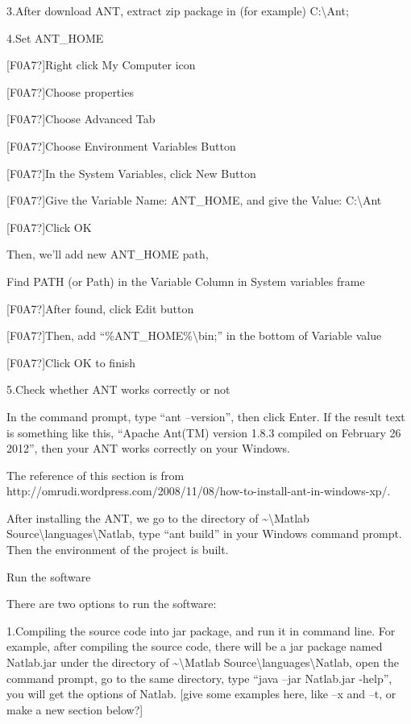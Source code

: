 \documentclass[letterpaper]{article}
\begin{document}
3.After download ANT, extract zip package in (for example)
C:{\textbackslash}Ant;

4.Set ANT\_HOME

[F0A7?]Right click My Computer icon

[F0A7?]Choose properties

[F0A7?]Choose Advanced Tab

[F0A7?]Choose Environment Variables Button

[F0A7?]In the System Variables, click New Button

[F0A7?]Give the Variable Name: ANT\_HOME, and give the Value:
C:{\textbackslash}Ant

[F0A7?]Click OK

Then, we{\textquoteright}ll add new ANT\_HOME path,

Find PATH (or Path) in the Variable Column in System variables frame

[F0A7?]After found, click Edit button

[F0A7?]Then, add
{\textquotedblleft}\%ANT\_HOME\%{\textbackslash}bin;{\textquotedblright}
in the bottom of Variable value

[F0A7?]Click OK to finish

5.Check whether ANT works correctly or not

In the command prompt, type {\textquotedblleft}ant
--version{\textquotedblright}, then click Enter. If the result text is
something like this, {\textquotedblleft}Apache Ant(TM) version 1.8.3
compiled on February 26 2012{\textquotedblright}, then your ANT works
correctly on your Windows.

The reference of this section is from
http://omrudi.wordpress.com/2008/11/08/how-to-install-ant-in-windows-xp/.

After installing the ANT, we go to the directory of
\~{}{\textbackslash}Matlab
Source{\textbackslash}languages{\textbackslash}Natlab, type
{\textquotedblleft}ant build{\textquotedblright} in your Windows
command prompt. Then the environment of the project is built.


\bigskip

Run the software

There are two options to run the software:

1.Compiling the source code into jar package, and run it in command
line. For example, after compiling the source code, there will be a jar
package named Natlab.jar under the directory of
\~{}{\textbackslash}Matlab
Source{\textbackslash}languages{\textbackslash}Natlab, open the command
prompt, go to the same directory, type {\textquotedblleft}java --jar
Natlab.jar -help{\textquotedblright}, you will get the options of
Natlab. [give some examples here, like --x and --t, or make a new
section below?]
\end{document}
